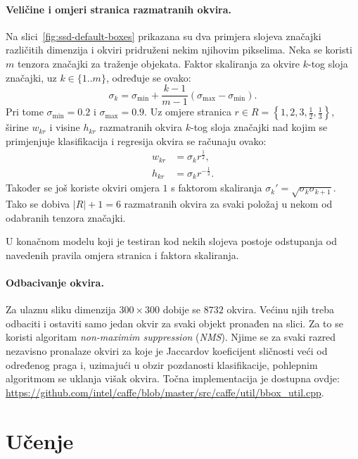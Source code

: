 \documentclass[utf8, seminar, numeric, lmodern]{feri}
\begin{document}
\paragraph{Veličine i omjeri stranica razmatranih okvira.} \label{par:ssd-model-okviri}
Na slici~\ref{fig:ssd-default-boxes} prikazana su dva primjera slojeva značajki različitih dimenzija i okviri pridruženi nekim njihovim pikselima. Neka se koristi $m$ tenzora značajki za traženje objekata. Faktor skaliranja za okvire $k$-tog sloja značajki, uz $k\in \{1..m\}$, određuje se ovako:
\begin{equation}
\sigma_k = \sigma_\mathrm{min} + \frac{k-1}{m-1}(\sigma_\mathrm{max}-\sigma_\mathrm{min}).
\end{equation}
Pri tome $\sigma_\mathrm{min} = 0.2$ i $\sigma_\mathrm{max}=0.9$. Uz omjere stranica $r\in R=\left\{1,2,3,\frac{1}{2},\frac{1}{3}\right\}$, širine $w_{kr}$ i visine $h_{kr}$ razmatranih okvira $k$-tog sloja značajki nad kojim se primjenjuje klasifikacija i regresija okvira se računaju ovako:
\begin{align}
w_{kr} &= \sigma_k r^{\frac{1}{2}}, \\
h_{kr} &= \sigma_k r^{-\frac{1}{2}}.
\end{align}
Također se još koriste okviri omjera $1$ s faktorom skaliranja $\sigma_k'=\sqrt{\sigma_k \sigma_{k+1}}$. Tako se dobiva $|R|+1=6$ razmatranih okvira za svaki položaj u nekom od odabranih tenzora značajki. 

U konačnom modelu koji je testiran kod nekih slojeva postoje odstupanja od navedenih pravila omjera stranica i faktora skaliranja.

\paragraph{Odbacivanje okvira.}
Za ulaznu sliku dimenzija $300\times 300$ dobije se $8732$ okvira. Većinu njih treba odbaciti i ostaviti samo jedan okvir za svaki objekt pronađen na slici. Za to se koristi algoritam \emph{non-maximim suppression} (\emph{NMS}). Njime se za svaki razred nezavisno pronalaze okviri za koje je Jaccardov koeficijent sličnosti veći od određenog praga i, uzimajući u obzir pozdanosti klasifikacije, pohlepnim algoritmom se uklanja višak okvira. Točna implementacija je dostupna ovdje: \url{https://github.com/intel/caffe/blob/master/src/caffe/util/bbox_util.cpp}.

\section{Učenje} \label{sec:ssd-ucenje}
\end{document}

